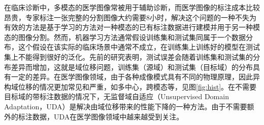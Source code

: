 在临床诊断中，多模态的医学图像常被用于辅助诊断，而医学图像的标注成本比较昂贵，专家标注一张完整的分割图像大约需要8小时\cite{zhuang2013challenges}，解决这个问题的一种不失为有效的方法是基于学习的方法对一种模态的已有标注数据进行建模并用于另一种模态的图像分割。然而，机器学习方法通常假设训练集和测试集同属于一个数据分布，这个假设在该实际的临床场景中通常不成立，在训练集上训练好的模型在测试集上不能得到很好的泛化。先前的研究表明，测试误差会随着训练集和测试集的分布差异而增加\cite{ben2007analysis}，这就是域位移问题，训练集（源域）和测试集（目标域）的分布具有一定的差异。在医学图像领域，由于各种成像模式具有不同的物理原理，因此异构域位移的情况更加常见和严重，如多中心，跨模态等，见图\ref{fig:hist}。在不需要目标域的带标注数据的情况下，无监督域自适应（Unsupervised Domain Adaptation，UDA）是解决由域位移带来的性能下降的一种方法。由于不需要额外的标注数据，UDA在医学图像领域中越来越受到关注。

